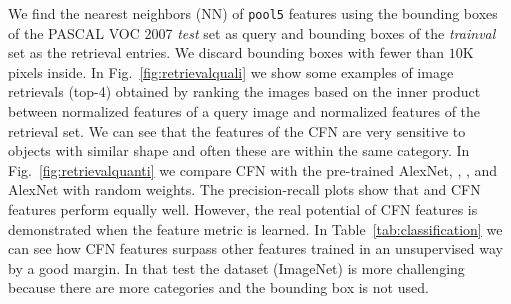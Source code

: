 \documentclass[runningheads]{llncs}
\begin{document}
We find the nearest neighbors (NN) of \texttt{pool5} features using the bounding boxes of the PASCAL VOC 2007 \emph{test} set as query and bounding boxes of the \emph{trainval} set as the retrieval entries. We discard bounding boxes with fewer than $10$K pixels inside. In Fig.~\ref{fig:retrievalquali} we show some examples of image retrievals (top-4) obtained by ranking the images based on the inner product between normalized  features of a query image and normalized features of the retrieval set. We can see that the features of the CFN are very sensitive to objects with similar shape and often these are within the same category. In Fig.~\ref{fig:retrievalquanti} we compare CFN with the pre-trained AlexNet, \cite{Carl2015}, \cite{Gupta15}, and AlexNet with random weights. The precision-recall plots show that \cite{Carl2015} and CFN features perform equally well. However, the real potential of CFN features is demonstrated when the feature metric is learned. In Table~\ref{tab:classification} we can see how CFN features surpass other features trained in an unsupervised way by a good margin. In that test the dataset (ImageNet) is more challenging because there are more categories and the bounding box is not used.
\end{document}
